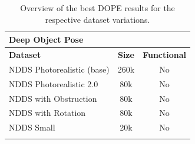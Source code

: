 \begin{longtable}{|l|c||c|}                            \hline
\multicolumn{3}{|l|}{\textbf{Deep Object Pose}}              \\\hline
\textbf{Dataset}            & \textbf{Size}  & \textbf{Functional}            \\ \hline
NDDS Photorealistic (base)       & 260k      & No                             \\ \hline
NDDS Photorealistic 2.0          & 80k       & No                             \\ \hline
NDDS with Obstruction       & 80k       & No                             \\ \hline
NDDS with Rotation          & 80k       & No                             \\ \hline
NDDS Small                  & 20k       & No                             \\ \hline
\caption{Overview of the best DOPE results for the respective dataset variations.} \label{tab:DOPE-results}
\end{longtable}

